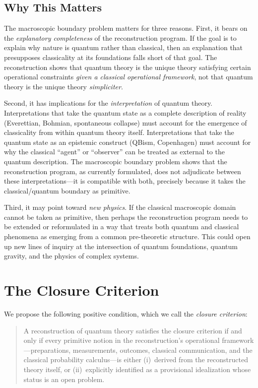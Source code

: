 \documentclass[12pt,a4paper,twoside]{article}
\begin{document}
\subsection{Why This Matters}

The macroscopic boundary problem matters for three reasons. First, it bears on the \emph{explanatory completeness} of the reconstruction program. If the goal is to explain why nature is quantum rather than classical, then an explanation that presupposes classicality at its foundations falls short of that goal. The reconstruction shows that quantum theory is the unique theory satisfying certain operational constraints \emph{given a classical operational framework}, not that quantum theory is the unique theory \emph{simpliciter}.

Second, it has implications for the \emph{interpretation} of quantum theory. Interpretations that take the quantum state as a complete description of reality (Everettian, Bohmian, spontaneous collapse) must account for the emergence of classicality from within quantum theory itself. Interpretations that take the quantum state as an epistemic construct (QBism, Copenhagen) must account for why the classical ``agent'' or ``observer'' can be treated as external to the quantum description. The macroscopic boundary problem shows that the reconstruction program, as currently formulated, does not adjudicate between these interpretations---it is compatible with both, precisely because it takes the classical/quantum boundary as primitive.

Third, it may point toward \emph{new physics}. If the classical macroscopic domain cannot be taken as primitive, then perhaps the reconstruction program needs to be extended or reformulated in a way that treats both quantum and classical phenomena as emerging from a common pre-theoretic structure. This could open up new lines of inquiry at the intersection of quantum foundations, quantum gravity, and the physics of complex systems.

\section{The Closure Criterion}

We propose the following positive condition, which we call the \emph{closure criterion}:

\begin{quote}
\noindent A reconstruction of quantum theory satisfies the closure criterion if and only if every primitive notion in the reconstruction's operational framework---preparations, measurements, outcomes, classical communication, and the classical probability calculus---is either (i)~derived from the reconstructed theory itself, or (ii)~explicitly identified as a provisional idealization whose status is an open problem.
\end{quote}
\end{document}
